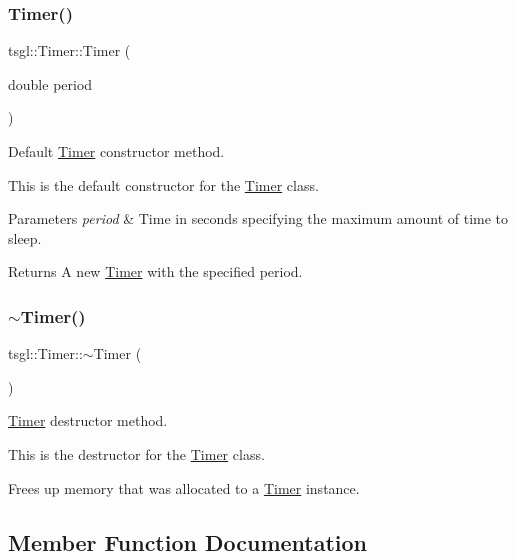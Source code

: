 \subsubsection{\texorpdfstring{Timer()}{Timer()}}
{\footnotesize\ttfamily tsgl\+::\+Timer\+::\+Timer (\begin{DoxyParamCaption}\item[{double}]{period }\end{DoxyParamCaption})}



Default \hyperlink{classtsgl_1_1_timer}{Timer} constructor method. 

This is the default constructor for the \hyperlink{classtsgl_1_1_timer}{Timer} class. 
\begin{DoxyParams}{Parameters}
{\em period} & Time in seconds specifying the maximum amount of time to sleep. \\
\hline
\end{DoxyParams}
\begin{DoxyReturn}{Returns}
A new \hyperlink{classtsgl_1_1_timer}{Timer} with the specified period. 
\end{DoxyReturn}
\mbox{\label{classtsgl_1_1_timer_a817d6b360361c744b13ff10377c130af}} 
\subsubsection{\texorpdfstring{$\sim$\+Timer()}{~Timer()}}
{\footnotesize\ttfamily tsgl\+::\+Timer\+::$\sim$\+Timer (\begin{DoxyParamCaption}{ }\end{DoxyParamCaption})\hspace{0.3cm}{\ttfamily [virtual]}}



\hyperlink{classtsgl_1_1_timer}{Timer} destructor method. 

This is the destructor for the \hyperlink{classtsgl_1_1_timer}{Timer} class.

Frees up memory that was allocated to a \hyperlink{classtsgl_1_1_timer}{Timer} instance. 

\subsection{Member Function Documentation}
\mbox{\label{classtsgl_1_1_timer_abbe94dcda6b42914bbc73a2ffc7f56cd}} 
